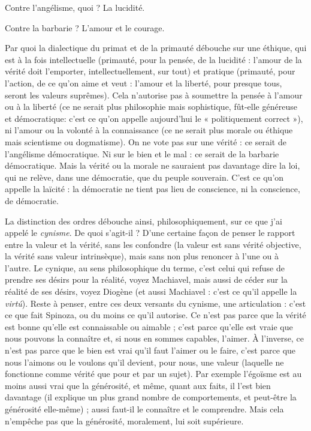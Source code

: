 Contre l’angélisme, quoi ? La lucidité.

Contre la barbarie ? L'amour et le courage.

Par quoi la dialectique du primat et de la primauté débouche sur une
éthique, qui est à la fois intellectuelle (primauté, pour la pensée, de la lucidité :
l'amour de la vérité doit l'emporter, intellectuellement, sur tout) et pratique
(primauté, pour l’action, de ce qu’on aime et veut : l’amour et la liberté, pour
presque tous, seront les valeurs suprêmes). Cela n’autorise pas à soumettre la
pensée à l’amour ou à la liberté (ce ne serait plus philosophie mais sophistique,
fût-elle généreuse et démocratique: c’est ce qu’on appelle aujourd’hui le
« politiquement correct »), ni l’amour ou la volonté à la connaissance (ce ne
serait plus morale ou éthique mais scientisme ou dogmatisme). On ne vote pas
sur une vérité : ce serait de l’angélisme démocratique. Ni sur le bien et le mal :
ce serait de la barbarie démocratique. Mais la vérité ou la morale ne sauraient
pas davantage dire la loi, qui ne relève, dans une démocratie, que du peuple
souverain. C’est ce qu’on appelle la laïcité : la démocratie ne tient pas lieu de
conscience, ni la conscience, de démocratie.

La distinction des ordres débouche ainsi, philosophiquement, sur ce que
j'ai appelé le {\it cynisme}. De quoi s'agit-il ? D’une certaine façon de penser le rapport
entre la valeur et la vérité, sans les confondre (la valeur est sans vérité
objective, la vérité sans valeur intrinsèque), mais sans non plus renoncer à l’une
ou à l’autre. Le cynique, au sens philosophique du terme, c’est celui qui refuse
de prendre ses désirs pour la réalité, voyez Machiavel, mais aussi de céder sur la
réalité de ses désirs, voyez Diogène (et aussi Machiavel : c’est ce qu’il appelle la
{\it virt\'{u}}). Reste à penser, entre ces deux versants du cynisme, une articulation :
c’est ce que fait Spinoza, ou du moins ce qu’il autorise. Ce n’est pas parce que
la vérité est bonne qu’elle est connaissable ou aimable ; c’est parce qu'elle est
vraie que nous pouvons la connaître et, si nous en sommes capables, l'aimer. À
l'inverse, ce n’est pas parce que le bien est vrai qu’il faut l’aimer ou le faire, c’est
parce que nous l’aimons ou le voulons qu’il devient, pour nous, une valeur
(laquelle ne fonctionne comme vérité que pour et par un sujet). Par exemple
l’égoïsme est au moins aussi vrai que la générosité, et même, quant aux faits, il
l’est bien davantage (il explique un plus grand nombre de comportements, et
peut-être la générosité elle-même) ; aussi faut-il le connaître et le comprendre.
Mais cela n'empêche pas que la générosité, moralement, lui soit supérieure.

